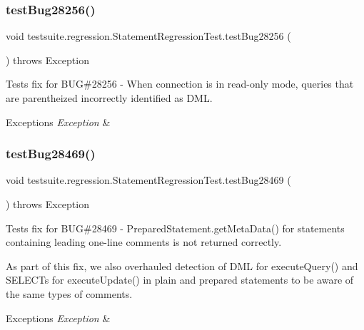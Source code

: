 \subsubsection{\texorpdfstring{test\+Bug28256()}{testBug28256()}}
{\footnotesize\ttfamily void testsuite.\+regression.\+Statement\+Regression\+Test.\+test\+Bug28256 (\begin{DoxyParamCaption}{ }\end{DoxyParamCaption}) throws Exception}

Tests fix for B\+UG\#28256 -\/ When connection is in read-\/only mode, queries that are parentheized incorrectly identified as D\+ML.


\begin{DoxyExceptions}{Exceptions}
{\em Exception} & \\
\hline
\end{DoxyExceptions}
\mbox{\label{classtestsuite_1_1regression_1_1_statement_regression_test_aa43369797070b07cf82bd806ef218255}} 
\subsubsection{\texorpdfstring{test\+Bug28469()}{testBug28469()}}
{\footnotesize\ttfamily void testsuite.\+regression.\+Statement\+Regression\+Test.\+test\+Bug28469 (\begin{DoxyParamCaption}{ }\end{DoxyParamCaption}) throws Exception}

Tests fix for B\+UG\#28469 -\/ Prepared\+Statement.\+get\+Meta\+Data() for statements containing leading one-\/line comments is not returned correctly.

As part of this fix, we also overhauled detection of D\+ML for execute\+Query() and S\+E\+L\+E\+C\+Ts for execute\+Update() in plain and prepared statements to be aware of the same types of comments.


\begin{DoxyExceptions}{Exceptions}
{\em Exception} & \\
\hline
\end{DoxyExceptions}
\mbox{\label{classtestsuite_1_1regression_1_1_statement_regression_test_a1d616199f65aad8a199b762687ef4880}} 
